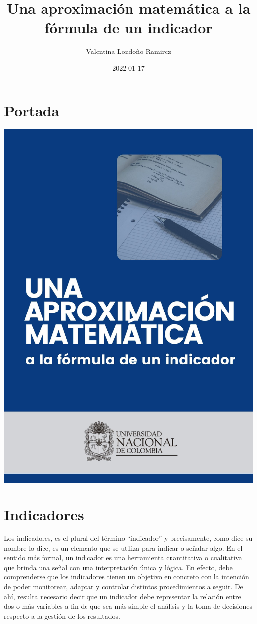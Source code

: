 \documentclass[
  11pt,
]{book}
\title{Una aproximación matemática a la fórmula de un indicador}
\author{Valentina Londoño Ramirez}
\date{2022-01-17}
\begin{document}
\maketitle

{
\hypersetup{linkcolor=}
\setcounter{tocdepth}{1}
\tableofcontents
}
\listoffigures
\listoftables
\hypertarget{portada}{%
\chapter*{Portada}\label{portada}}

\begin{center}\includegraphics[width=0.5\linewidth]{ProtectoR/portada} \end{center}

\hypertarget{intro}{%
\chapter{Indicadores}\label{intro}}

Los indicadores, es el plural del término ``indicador'' y precisamente, como dice su nombre lo dice, es un elemento que se utiliza para indicar o señalar algo. En el sentido más formal, un indicador es una herramienta cuantitativa o cualitativa que brinda una señal con una interpretación única y lógica. En efecto, debe comprenderse que los indicadores tienen un objetivo en concreto con la intención de poder monitorear, adaptar y controlar distintos procedimientos a seguir. De ahí, resulta necesario decir que un indicador debe representar la relación entre dos o más variables a fin de que sea más simple el análisis y la toma de decisiones respecto a la gestión de los resultados.
\end{document}
